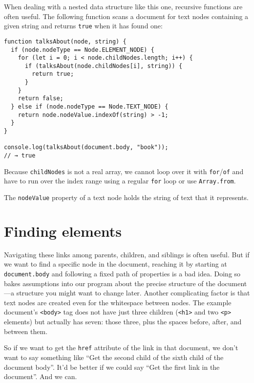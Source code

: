 When dealing with a nested data structure like this one, recursive functions are often useful. The following function scans a document for text nodes containing a given string and returns \lstinline`true` when it has found one:

\label{dom.talksAbout}\begin{lstlisting}
function talksAbout(node, string) {
  if (node.nodeType == Node.ELEMENT_NODE) {
    for (let i = 0; i < node.childNodes.length; i++) {
      if (talksAbout(node.childNodes[i], string)) {
        return true;
      }
    }
    return false;
  } else if (node.nodeType == Node.TEXT_NODE) {
    return node.nodeValue.indexOf(string) > -1;
  }
}

console.log(talksAbout(document.body, "book"));
// → true
\end{lstlisting}
\noindent{}

Because \lstinline`childNodes` is not a real array, we cannot loop over it with \lstinline`for`/\lstinline`of` and have to run over the index range using a regular \lstinline`for` loop or use \lstinline`Array.from`.

The \lstinline`nodeValue` property of a text node holds the string of text that it represents.

\section{Finding elements}

Navigating these links among parents, children, and siblings is often useful. But if we want to find a specific node in the document, reaching it by starting at \lstinline`document.body` and following a fixed path of properties is a bad idea. Doing so bakes assumptions into our program about the precise structure of the document—a structure you might want to change later. Another complicating factor is that text nodes are created even for the whitespace between nodes. The example document's \lstinline`<body>` tag does not have just three children (\lstinline`<h1>` and two \lstinline`<p>` elements) but actually has seven: those three, plus the spaces before, after, and between them.

So if we want to get the \lstinline`href` attribute of the link in that document, we don't want to say something like ``Get the second child of the sixth child of the document body''. It'd be better if we could say ``Get the first link in the document''. And we can.


